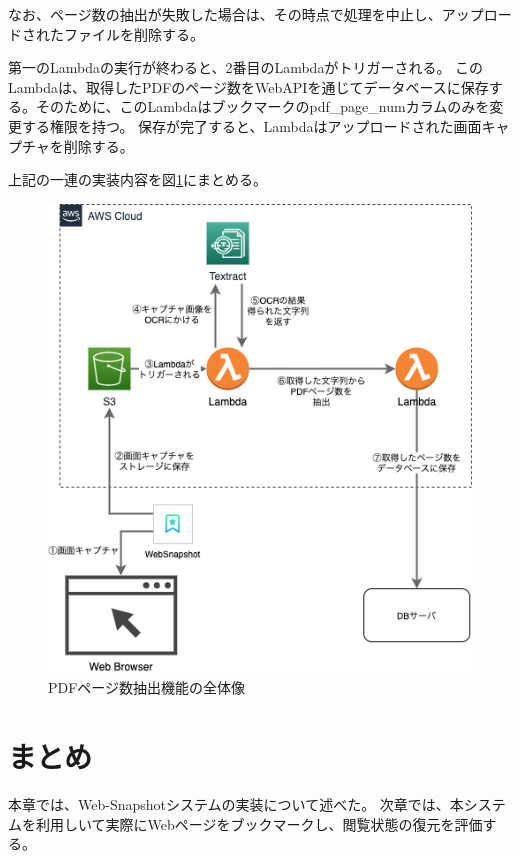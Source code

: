 なお、ページ数の抽出が失敗した場合は、その時点で処理を中止し、アップロードされたファイルを削除する。

第一のLambdaの実行が終わると、2番目のLambdaがトリガーされる。
このLambdaは、取得したPDFのページ数をWebAPIを通じてデータベースに保存する。そのために、このLambdaはブックマークのpdf\_page\_numカラムのみを変更する権限を持つ。
保存が完了すると、Lambdaはアップロードされた画面キャプチャを削除する。

上記の一連の実装内容を図\ref{fig:impl-pdf-overall}にまとめる。

\begin{figure}[htbp]
  \caption{PDFページ数抽出機能の全体像}
  \label{fig:impl-pdf-overall}
  \begin{center}
    \includegraphics[bb=0 0 480 532,width=15cm]{img/050_implementation/server/impl-pdf-overall.pdf}
  \end{center}
\end{figure}

\section{まとめ}
本章では、Web-Snapshotシステムの実装について述べた。
次章では、本システムを利用しいて実際にWebページをブックマークし、閲覧状態の復元を評価する。